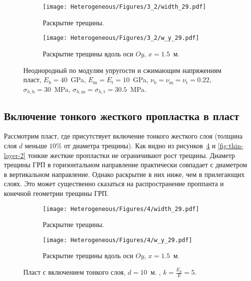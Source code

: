 \begin{figure}[htbp]
    \centering
    \begin{subfigure}[t]{0.4\textwidth}
        \centering
        \texttt{[image: Heterogeneous/Figures/3\_2/width\_29.pdf]}
        \caption{Раскрытие трещины.}
        \label{fig:comparison-2-planar}
    \end{subfigure}
    \hfill 
    \begin{subfigure}[t]{0.55\textwidth}
        \centering
        \texttt{[image: Heterogeneous/Figures/3\_2/w\_y\_29.pdf]}
        \caption{Раскрытие трещины вдоль оси $Oy$, $x=1.5$~м.}
        \label{fig:comparison-2-slice}
    \end{subfigure}
    \caption{Неоднородный по модулям упругости и сжимающим напряжениям пласт, $E_\text{b} = 40$~GPa, $E_\text{m} = E_\text{t} = 10$~GPa, $\nu_\text{b} = \nu_\text{m} = \nu_\text{t} = 0.22$, $\sigma_{h,\text{b}} = 30$~MPa, $\sigma_{h,\text{m}} = \sigma_{h,\text{t}} = 30.5$~MPa.}
    \label{fig:comparison-2}
\end{figure}


\subsection{Включение тонкого жесткого пропластка в пласт}
Рассмотрим пласт, где присутствует включение тонкого жесткого слоя (толщина слоя $d$ меньше $10\%$ от диаметра трещины). Как видно из рисунков~\ref{fig:thin-layer-1} и \ref{fig:thin-layer-2} тонкие жесткие пропластки не ограничивают рост трещины. Диаметр трещины ГРП в горизонтальном направление практически совпадает с диаметром в вертикальном направление. Однако раскрытие в них ниже, чем в прилегающих слоях. Это может существенно сказаться на распространение проппанта и конечной геометрии трещины ГРП. 
\begin{figure}[htbp]
    \centering
    \begin{subfigure}[t]{0.4\textwidth}
        \centering
        \texttt{[image: Heterogeneous/Figures/4/width\_29.pdf]}
        \caption{Раскрытие трещины.}
    \end{subfigure}
    \hfill 
    \begin{subfigure}[t]{0.55\textwidth}
        \centering
        \texttt{[image: Heterogeneous/Figures/4/w\_y\_29.pdf]}
        \caption{Раскрытие трещины вдоль оси $Oy$, $x=1.5$~м.}
    \end{subfigure}
    \caption{Пласт с включением тонкого слоя, $d=10$~м. , $k=\frac{E_d}{E}=5$.}
    \label{fig:thin-layer-1}
\end{figure}

